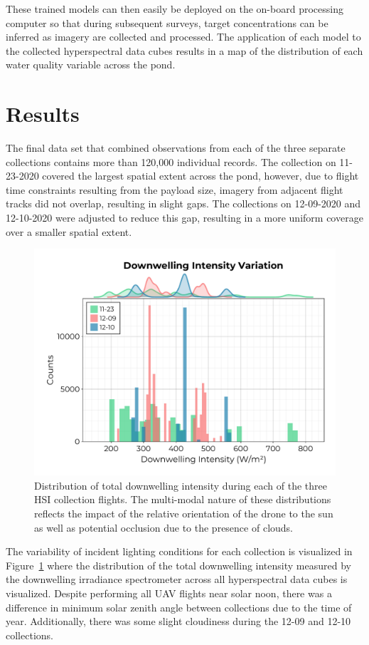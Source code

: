 \documentclass[remotesensing,article,submit,pdftex,moreauthors]{Definitions/mdpi}
\begin{document}
These trained models can then easily be deployed on the on-board processing computer so that during subsequent surveys, target concentrations can be inferred as imagery are collected and processed. The application of each model to the collected hyperspectral data cubes results in a map of the distribution of each water quality variable across the pond.

\section{Results}

The final data set that combined observations from each of the three separate collections contains more than 120,000 individual records. The collection on 11-23-2020 covered the largest spatial extent across the pond, however, due to flight time constraints resulting from the payload size, imagery from adjacent flight tracks did not overlap, resulting in slight gaps. The collections on 12-09-2020 and 12-10-2020 were adjusted to reduce this gap, resulting in a more uniform coverage over a smaller spatial extent. 

\begin{figure}
\includegraphics[width=0.7\columnwidth]{paper/figures/results/downwelling-hist.pdf}
\caption{Distribution of total downwelling intensity during each of the three HSI collection flights. The multi-modal nature of these distributions reflects the impact of the relative orientation of the drone to the sun as well as potential occlusion due to the presence of clouds.\label{fig:downwelling-hist}}
\end{figure}   

The variability of incident lighting conditions for each collection is visualized in Figure~\ref{fig:downwelling-hist} where the distribution of the total downwelling intensity measured by the downwelling irradiance spectrometer across all hyperspectral data cubes is visualized. Despite performing all UAV flights near solar noon, there was a difference in minimum solar zenith angle between collections due to the time of year. Additionally, there was some slight cloudiness during the 12-09 and 12-10 collections. 
\end{document}
